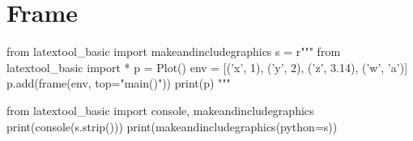\section{Frame}

\begin{python}
from latextool_basic import makeandincludegraphics
s = r"""
from latextool_basic import *
p = Plot()
env = [('x', 1), ('y', 2), ('z', 3.14), ('w', 'a')]
p.add(frame(env, top="main()"))
print(p)
"""

from latextool_basic import console, makeandincludegraphics
print(console(s.strip()))
print(makeandincludegraphics(python=s))
\end{python}


